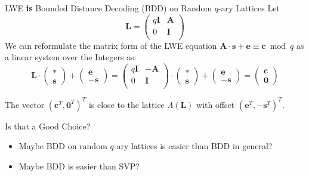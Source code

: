 \documentclass[xcolor=table,10pt,aspectratio=169]{beamer}
\renewcommand{\vec}[1]{\ensuremath{\mathbf{#1}}\xspace}
\providecommand{\mat}[1]{\ensuremath{\vec{#1}}\xspace}
\begin{document}
\begin{frame}[label={sec:org18ac27b}]{LWE \textbf{is} Bounded Distance Decoding (BDD) on Random \(q\)-ary Lattices}
Let
\[
\mat{L} =  \begin{pmatrix}
    q\mat{I} & \mat{A}\\
    0 & \mat{I}\\
  \end{pmatrix}
\]
We can reformulate the matrix form of the LWE equation \(\vec{A} \cdot \vec{s} + \vec{e} \equiv \vec{c} \bmod q\) as a linear system over the Integers as:
\[
  \mat{L} \cdot
  \begin{pmatrix}
    \vec{*}\\
    \vec{s}
  \end{pmatrix} +
  \begin{pmatrix}
    \vec{e}\\
    -\vec{s}
  \end{pmatrix}  
 = 
  \begin{pmatrix}
    q\mat{I} & -\mat{A}\\
    0 & \mat{I}\\
  \end{pmatrix} \cdot
  \begin{pmatrix}
    \vec{*}\\
    \vec{s}
  \end{pmatrix} +
  \begin{pmatrix}
    \vec{e}\\
    -\vec{s}
  \end{pmatrix}  
= 
  \begin{pmatrix}
    \vec{c}\\
    \vec{0}
  \end{pmatrix}
\]

The vector \((\vec{c}^T, \vec{0}^T)^T\) is close to the lattice \(\Lambda\left(\mat{L}\right)\) with offset \((\vec{e}^T, -\vec{s}^T)^T\).
\end{frame}
\begin{frame}[label={sec:org41f81c1}]{Is that a Good Choice?}
\begin{itemize}
\item Maybe BDD on random \(q\)-ary lattices is easier than BDD in general?
\item Maybe BDD is easier than SVP?
\end{itemize}
\end{frame}
\end{document}
